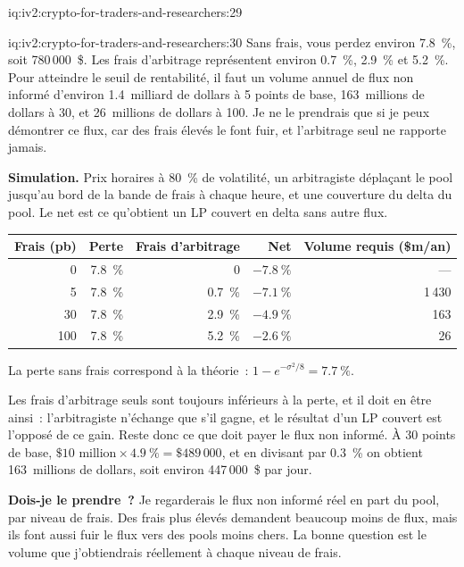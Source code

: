 \begin{solution}{iq:iv2:crypto-for-traders-and-researchers:29}
\end{solution}

\begin{solution}{iq:iv2:crypto-for-traders-and-researchers:30}
Sans frais, vous perdez environ 7.8~\%, soit 780\,000~\$. Les frais d'arbitrage représentent environ 0.7~\%, 2.9~\% et 5.2~\%. Pour atteindre le seuil de rentabilité, il faut un volume annuel de flux non informé d'environ 1.4~milliard de dollars à 5 points de base, 163~millions de dollars à 30, et 26~millions de dollars à 100. Je ne le prendrais que si je peux démontrer ce flux, car des frais élevés le font fuir, et l'arbitrage seul ne rapporte jamais.

\textbf{Simulation.} Prix horaires à 80~\% de volatilité, un arbitragiste déplaçant le pool jusqu'au bord de la bande de frais à chaque heure, et une couverture du delta du pool. Le net est ce qu'obtient un LP couvert en delta sans autre flux.

\begin{center}
\begin{tabular}{rrrrr}
\toprule
Frais (pb) & Perte & Frais d'arbitrage & Net & Volume requis (\$m/an) \\
\midrule
0 & 7.8~\% & 0 & $-7.8~\%$ & --- \\
5 & 7.8~\% & 0.7~\% & $-7.1~\%$ & 1\,430 \\
30 & 7.8~\% & 2.9~\% & $-4.9~\%$ & 163 \\
100 & 7.8~\% & 5.2~\% & $-2.6~\%$ & 26 \\
\bottomrule
\end{tabular}
\end{center}

La perte sans frais correspond à la théorie~: $1 - e^{-\sigma^2/8} = 7.7~\%$.

Les frais d'arbitrage seuls sont toujours inférieurs à la perte, et il doit en être ainsi~: l'arbitragiste n'échange que s'il gagne, et le résultat d'un LP couvert est l'opposé de ce gain. Reste donc ce que doit payer le flux non informé. À 30 points de base, $\$10 \text{ million} \times 4.9~\% = \$489\,000$, et en divisant par 0.3~\% on obtient 163~millions de dollars, soit environ 447\,000~\$ par jour.

\textbf{Dois-je le prendre~?} Je regarderais le flux non informé réel en part du pool, par niveau de frais. Des frais plus élevés demandent beaucoup moins de flux, mais ils font aussi fuir le flux vers des pools moins chers. La bonne question est le volume que j'obtiendrais réellement à chaque niveau de frais.


\end{solution}
